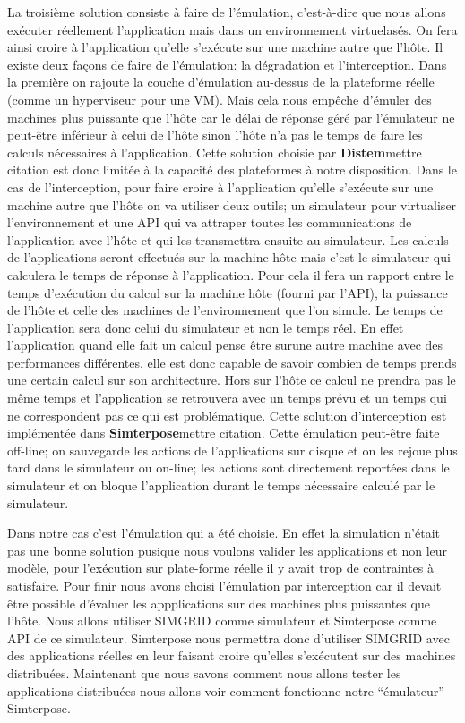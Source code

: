 La troisième solution consiste à faire de l'émulation, c'est-à-dire que nous allons exécuter réellement l'application mais dans un environnement virtuelasés. On fera ainsi croire à l'application qu'elle s'exécute sur une machine autre que l'hôte. Il existe deux façons de faire de l'émulation: la dégradation et l'interception. Dans la première on rajoute la couche d'émulation au-dessus de la plateforme réelle (comme un hyperviseur pour une VM). Mais cela nous empêche d'émuler des machines plus puissante que l'hôte car le délai de réponse géré par l'émulateur ne peut-être inférieur à celui de l'hôte sinon l'hôte n'a pas le temps de faire les calculs nécessaires à l'application. Cette solution choisie par \textbf{Distem}{\color{red}mettre citation} est donc limitée à la capacité des plateformes à notre disposition. 
Dans le cas de l'interception, pour faire croire à l'application qu'elle s'exécute sur une machine autre que l'hôte on va utiliser deux outils; un simulateur pour virtualiser l'environnement et une {\color{red}API} qui va attraper toutes les communications de l'application avec l'hôte et qui les transmettra ensuite au simulateur. Les calculs de l'applications seront effectués sur la machine hôte mais c'est le simulateur qui calculera le temps de réponse à l'application. Pour cela il fera un rapport entre le temps d'exécution du calcul sur la machine hôte (fourni par l'API), la puissance de l'hôte et celle des machines de l'environnement que l'on simule. Le temps de l'application sera donc celui du simulateur et non le temps réel. En effet l'application quand elle fait un calcul pense être surune autre machine avec des performances différentes, elle est donc capable de savoir combien de temps prends une certain calcul sur son architecture. Hors sur l'hôte ce calcul ne prendra pas le même temps et l'application se retrouvera avec un temps prévu et un temps qui ne correspondent pas ce qui est problématique. Cette solution d'interception est implémentée dans \textbf{Simterpose}{\color{red}mettre citation}. Cette émulation peut-être faite off-line; on sauvegarde les actions de l'applications sur disque et on les rejoue plus tard dans le simulateur ou on-line; les actions sont directement reportées dans le simulateur et on bloque l'application durant le temps nécessaire calculé par le simulateur.

Dans notre cas c'est l'émulation qui a été choisie. En effet la simulation n'était pas une bonne solution pusique nous voulons valider les applications et non leur modèle, pour l'exécution sur plate-forme réelle il y avait trop de contraintes à satisfaire. Pour finir nous avons choisi l'émulation par interception car il devait être possible d'évaluer les appplications sur des machines plus puissantes que l'hôte. Nous allons utiliser SIMGRID comme simulateur et Simterpose comme API de ce simulateur. Simterpose nous permettra donc d'utiliser SIMGRID avec des applications réelles en leur faisant croire qu'elles s'exécutent sur des machines distribuées. Maintenant que nous savons comment nous allons tester les applications distribuées nous allons voir comment fonctionne notre ``émulateur'' Simterpose.
